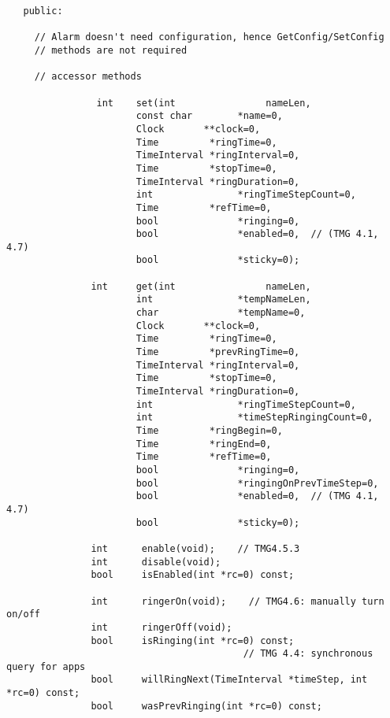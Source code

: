 \begin{verbatim} 
   public:
 
     // Alarm doesn't need configuration, hence GetConfig/SetConfig
     // methods are not required
 
     // accessor methods
 
                int    set(int                nameLen,
                       const char        *name=0,
                       Clock       **clock=0,
                       Time         *ringTime=0,
                       TimeInterval *ringInterval=0,
                       Time         *stopTime=0,
                       TimeInterval *ringDuration=0,
                       int               *ringTimeStepCount=0,
                       Time         *refTime=0,
                       bool              *ringing=0,
                       bool              *enabled=0,  // (TMG 4.1, 4.7)
                       bool              *sticky=0);
 
               int     get(int                nameLen,
                       int               *tempNameLen,
                       char              *tempName=0,
                       Clock       **clock=0,
                       Time         *ringTime=0,
                       Time         *prevRingTime=0,
                       TimeInterval *ringInterval=0,
                       Time         *stopTime=0,
                       TimeInterval *ringDuration=0,
                       int               *ringTimeStepCount=0,
                       int               *timeStepRingingCount=0,
                       Time         *ringBegin=0,
                       Time         *ringEnd=0,
                       Time         *refTime=0,
                       bool              *ringing=0,
                       bool              *ringingOnPrevTimeStep=0,
                       bool              *enabled=0,  // (TMG 4.1, 4.7)
                       bool              *sticky=0);
 
               int      enable(void);    // TMG4.5.3
               int      disable(void);
               bool     isEnabled(int *rc=0) const;
 
               int      ringerOn(void);    // TMG4.6: manually turn on/off
               int      ringerOff(void);
               bool     isRinging(int *rc=0) const;
                                          // TMG 4.4: synchronous query for apps
               bool     willRingNext(TimeInterval *timeStep, int *rc=0) const;
               bool     wasPrevRinging(int *rc=0) const;
 

\end{verbatim}
